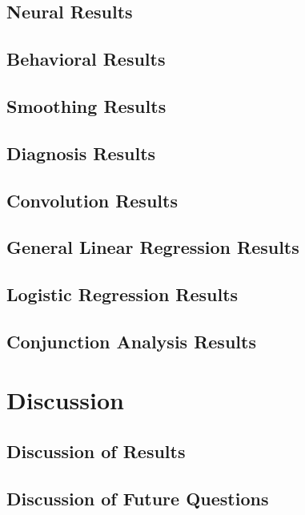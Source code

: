 \documentclass[11pt]{article}
\begin{document}
    \subsection{Neural Results}
            
    \subsection{Behavioral Results}
            
    \subsection{Smoothing Results}
            
    \subsection{Diagnosis Results}
            
    \subsection{Convolution Results}
            
    \subsection{General Linear Regression Results}
            
    \subsection{Logistic Regression Results}
            
    \subsection{Conjunction Analysis Results}
            

\section{Discussion}

    \subsection{Discussion of Results}
            
    \subsection{Discussion of Future Questions}
            


\end{document}
